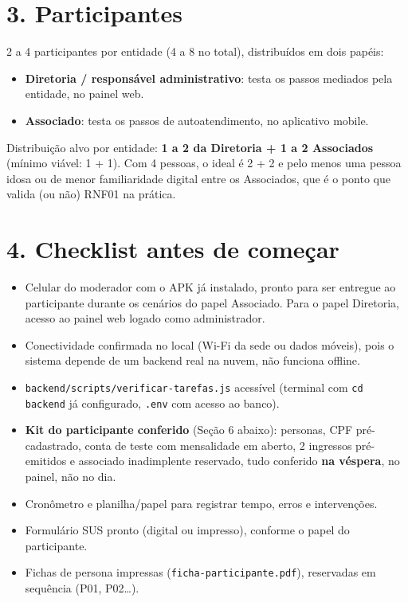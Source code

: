 \documentclass[11pt,a4paper]{article}
\begin{document}
\section*{3. Participantes}

2 a 4 participantes por entidade (4 a 8 no total), distribuídos em dois papéis:

\begin{itemize}[leftmargin=6mm]
  \item \textbf{Diretoria / responsável administrativo}: testa os passos mediados pela
    entidade, no painel web.
  \item \textbf{Associado}: testa os passos de autoatendimento, no aplicativo mobile.
\end{itemize}

Distribuição alvo por entidade: \textbf{1 a 2 da Diretoria + 1 a 2 Associados} (mínimo viável:
1 + 1). Com 4 pessoas, o ideal é 2 + 2 e pelo menos uma pessoa idosa ou de menor familiaridade
digital entre os Associados, que é o ponto que valida (ou não) RNF01 na prática.

\section*{4. Checklist antes de começar}

\begin{itemize}[leftmargin=6mm]
  \item[$\square$] Celular do moderador com o APK já instalado, pronto para ser entregue ao
    participante durante os cenários do papel Associado. Para o papel Diretoria, acesso ao painel
    web logado como administrador.
  \item[$\square$] Conectividade confirmada no local (Wi-Fi da sede ou dados móveis), pois o sistema
    depende de um backend real na nuvem, não funciona offline.
  \item[$\square$] \texttt{backend/scripts/verificar-tarefas.js} acessível (terminal com
    \texttt{cd backend} já configurado, \texttt{.env} com acesso ao banco).
  \item[$\square$] \textbf{Kit do participante conferido} (Seção 6 abaixo): personas, CPF
    pré-cadastrado, conta de teste com mensalidade em aberto, 2 ingressos pré-emitidos e associado
    inadimplente reservado, tudo conferido \textbf{na véspera}, no painel, não no dia.
  \item[$\square$] Cronômetro e planilha/papel para registrar tempo, erros e intervenções.
  \item[$\square$] Formulário SUS pronto (digital ou impresso), conforme o papel do participante.
  \item[$\square$] Fichas de persona impressas (\texttt{ficha-participante.pdf}), reservadas em
    sequência (P01, P02\ldots).
\end{itemize}
\end{document}
